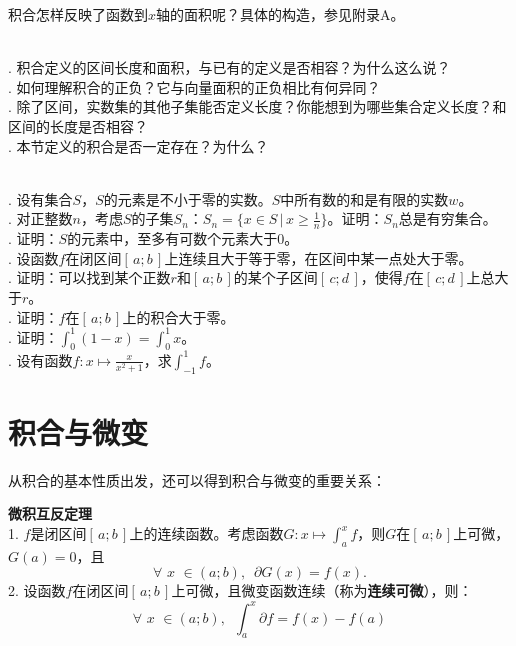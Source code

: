 \documentclass[12pt,UTF8,fontset=none]{ctexbook}
\begin{document}
积合怎样反映了函数到$x$轴的面积呢？具体的构造，参见附录A。

\begin{sk}
    \mbox{} \\
    . 积合定义的区间长度和面积，与已有的定义是否相容？为什么这么说？\\
    . 如何理解积合的正负？它与向量面积的正负相比有何异同？\\
    . 除了区间，实数集的其他子集能否定义长度？你能想到为哪些集合定义长度？和区间的长度是否相容？\\
    . 本节定义的积合是否一定存在？为什么？
\end{sk}

\begin{xt}
    \mbox{} \\
    . 设有集合$S$，$S$的元素是不小于零的实数。$S$中所有数的和是有限的实数$w$。\\
    . 对正整数$n$，考虑$S$的子集$S_n$：$S_n = \{x\in S \, | \, x \geqslant \frac{1}{n}\}$。证明：$S_n$总是有穷集合。\\
    . 证明：$S$的元素中，至多有可数个元素大于$0$。\\
    . 设函数$f$在闭区间$[\,a; b\,]$上连续且大于等于零，在区间中某一点处大于零。\\
    . 证明：可以找到某个正数$r$和$[\,a; b\,]$的某个子区间$[\,c;d\,]$，使得$f$在$[\,c;d\,]$上总大于$r$。\\
    . 证明：$f$在$[\,a; b\,]$上的积合大于零。\\
    . 证明：$\int_0^1 (1 - x) = \int_0^1 x$。\\
    . 设有函数$f: x\mapsto \frac{x}{x^2+1}$，求$\int_{-1}^1 f$。\\
\end{xt}

\section{积合与微变}
从积合的基本性质出发，还可以得到积合与微变的重要关系：

\begin{tm}{\textbf{微积互反定理}}
    \mbox{} \\
    1. $f$是闭区间$[\,a; b\,]$上的连续函数。考虑函数$G: x\mapsto \int_a^x f$，则$G$在$[\,a; b\,]$上可微，
    $G(a) = 0$，且
    $$\forall \,\, x\,\,\in(a; b), \,\,\, \partial G (x) = f(x).$$
    2. 设函数$f$在闭区间$[\,a; b\,]$上可微，且微变函数连续（称为\textbf{连续可微}），则：
    $$ \forall \,\, x\,\,\in(a; b), \,\,\, \int_a^x \partial f = f(x) - f(a) $$
\end{tm}
\end{document}
